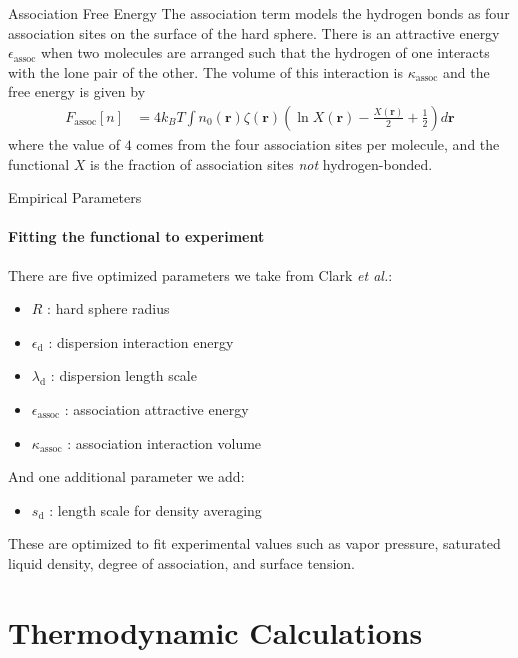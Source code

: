 \documentclass{beamer}
\newcommand{\xx}{\textbf{r}}
\begin{document}
\begin{frame}[fragile]{Association Free Energy}
The association term models the hydrogen bonds as
four association sites on the surface of the
hard sphere. There is an attractive energy
$\epsilon_\text{assoc}$ when two molecules are arranged such that
the hydrogen of one interacts with the lone pair of the other.  The
volume of this interaction is $\kappa_\text{assoc}$ and the free 
energy is given by
\begin{align}  
  F_\text{assoc}[n] &= 4 k_BT \int n_0(\xx)\zeta(\xx)
  \left(\ln X(\xx) - \frac{X(\xx)}{2} + \frac12\right) d\xx
\end{align}
where the value of $4$ comes from the four association sites per
molecule, and the functional $X$ is the fraction of association sites
\emph{not} hydrogen-bonded. 
\end{frame}

\begin{frame}[fragile]{Empirical Parameters}
\framesubtitle{Fitting the functional to experiment}
There are five optimized parameters we take from Clark \emph{et al.}:
\begin{itemize}
 \item <2-> $R$ : hard sphere radius
 \item <3-> $\epsilon_\text{d}$ : dispersion interaction energy
 \item <4-> $\lambda_\text{d}$ : dispersion length scale
 \item <5-> $\epsilon_\text{assoc}$ : association attractive energy
 \item <6-> $\kappa_\text{assoc}$ : association interaction volume
\end{itemize}
\vspace{0.4cm}
\pause\pause\pause\pause\pause\pause
And one additional parameter we add:
\begin{itemize}
 \item <7-> $s_\text{d}$ : length scale for density averaging
\end{itemize}
\vspace{0.4cm}
\pause
These are optimized to fit experimental values such as vapor pressure, saturated 
liquid density, degree of association, and surface tension.
\end{frame}

\section{Thermodynamic Calculations}
\subsection*{}
\end{document}
